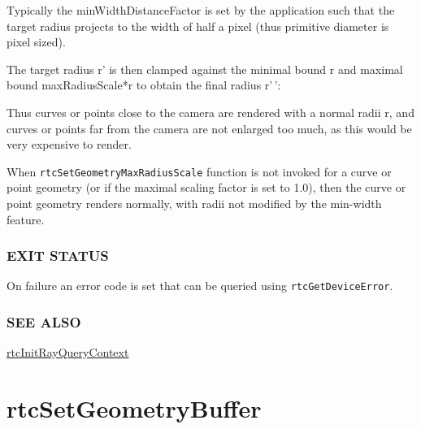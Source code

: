 \begin{Shaded}
\begin{Highlighting}[]
\CharTok{\textquotesingle{} }
\end{Highlighting}
\end{Shaded}

Typically the minWidthDistanceFactor is set by the application such that
the target radius projects to the width of half a pixel (thus primitive
diameter is pixel sized).

The target radius r' is then clamped against the minimal bound r and
maximal bound maxRadiusScale*r to obtain the final radius r'\,':

\begin{Shaded}
\begin{Highlighting}[]
\CharTok{\textquotesingle{}}\ErrorTok{\textquotesingle{}} \OperatorTok{=}\OperatorTok{(}\OperatorTok{,}\OperatorTok{(}\CharTok{\textquotesingle{},}
\end{Highlighting}
\end{Shaded}

Thus curves or points close to the camera are rendered with a normal
radii r, and curves or points far from the camera are not enlarged too
much, as this would be very expensive to render.

When \texttt{rtcSetGeometryMaxRadiusScale} function is not invoked for a
curve or point geometry (or if the maximal scaling factor is set to
1.0), then the curve or point geometry renders normally, with radii not
modified by the min-width feature.

\subsubsection{EXIT STATUS}\label{exit-status}

On failure an error code is set that can be queried using
\texttt{rtcGetDeviceError}.

\subsubsection{SEE ALSO}\label{see-also}

\hyperref[rtcinitrayquerycontext]{rtcInitRayQueryContext}

\pagebreak

\section{rtcSetGeometryBuffer}\label{rtcsetgeometrybuffer}


